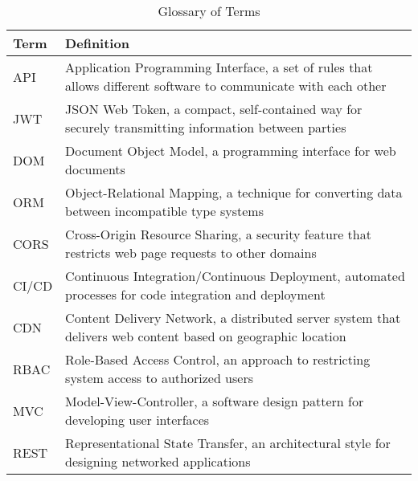 \documentclass[12pt,a4paper]{article}
\begin{document}
\begin{table}[H]
\centering
\begin{tabular}{|p{4cm}|p{10cm}|}
\hline
\textbf{Term} & \textbf{Definition} \\
\hline
API & Application Programming Interface, a set of rules that allows different software to communicate with each other \\
\hline
JWT & JSON Web Token, a compact, self-contained way for securely transmitting information between parties \\
\hline
DOM & Document Object Model, a programming interface for web documents \\
\hline
ORM & Object-Relational Mapping, a technique for converting data between incompatible type systems \\
\hline
CORS & Cross-Origin Resource Sharing, a security feature that restricts web page requests to other domains \\
\hline
CI/CD & Continuous Integration/Continuous Deployment, automated processes for code integration and deployment \\
\hline
CDN & Content Delivery Network, a distributed server system that delivers web content based on geographic location \\
\hline
RBAC & Role-Based Access Control, an approach to restricting system access to authorized users \\
\hline
MVC & Model-View-Controller, a software design pattern for developing user interfaces \\
\hline
REST & Representational State Transfer, an architectural style for designing networked applications \\
\hline
\end{tabular}
\caption{Glossary of Terms}
\end{table}
\end{document}
